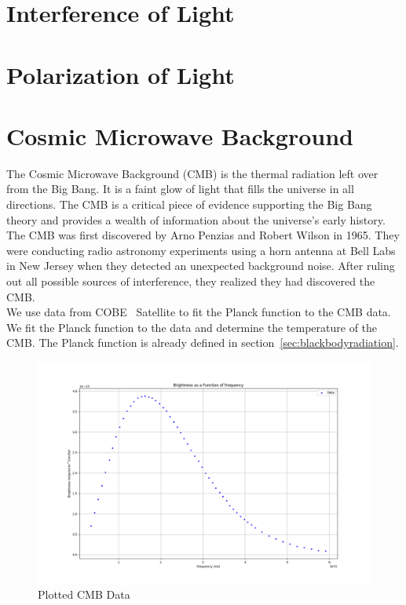 \clearpage

\section{Interference of Light}

\clearpage

\section{Polarization of Light}

\clearpage

\section{Cosmic Microwave Background}

The Cosmic Microwave Background (CMB) is the thermal radiation left over from the Big Bang. It is a faint glow of light that fills the universe in all directions. The CMB is a critical piece of evidence supporting the Big Bang theory and provides a wealth of information about the universe's early history. \\

The CMB was first discovered by Arno Penzias and Robert Wilson in 1965. They were conducting radio astronomy experiments using a horn antenna at Bell Labs in New Jersey when they detected an unexpected background noise. After ruling out all possible sources of interference, they realized they had discovered the CMB. \\

We use data from COBE~\cite{1990ApJ...354L..37M} Satellite to fit the Planck function to the CMB data. We fit the Planck function to the data and determine the temperature of the CMB. The Planck function is already defined in section~\ref{sec:blackbodyradiation}.

\begin{figure}[H]
	\centering
	\includegraphics[width=\textwidth]{Images/COBE_CMB_data.png}
	\caption{Plotted CMB Data}
	\label{fig:cmb_fit}
\end{figure}


